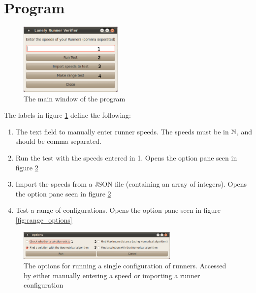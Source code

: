 \section{Program}
\label{section:program}

\begin{figure}[H]
  \centering
  \includegraphics[width=0.45\textwidth]{./images/Lonely_Runner_Verifier}
  \caption{\label{fig:main_window}The main window of the program}
\end{figure}

The labels in figure \ref{fig:main_window} define the following:
\begin{enumerate}
\item The text field to manually enter runner speeds. The speeds must be in $\mathbb{N}$, and should be comma separated.
\item Run the test with the speeds entered in 1. Opens the option pane seen in figure \ref{fig:options}
\item Import the speeds from a JSON file (containing an array of integers). Opens the option pane seen in figure \ref{fig:options}
\item Test a range of configurations. Opens the option pane seen in figure \ref{fig:range_options}
\end{enumerate}

\begin{figure}[H]
  \centering
  \includegraphics[width=0.70\textwidth]{./images/Options}
  \caption{\label{fig:options}The options for running a single configuration of runners. Accessed by either manually entering a speed or importing a runner configuration}
\end{figure}

